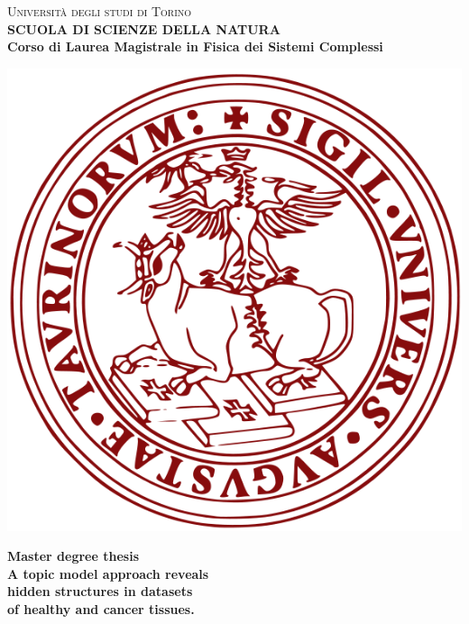 \begin{titlepage}
\begin{center}
{{\Large{\textsc{Universit\`a degli studi di Torino \\}}}} \vspace{5mm} {\small{\bf SCUOLA DI SCIENZE DELLA NATURA\\ \vspace{3mm}
Corso di Laurea Magistrale in Fisica dei Sistemi Complessi}}
\vspace{5mm}
\end{center}
\begin{center}
\includegraphics[scale=.3]{head/logo.png}
\end{center}
\begin{center}
\vspace{5mm}
{\large{\bf Master degree thesis\\}}
\vspace{5mm}
{\LARGE{\bf A topic model approach reveals \\hidden structures in datasets \\ of healthy and cancer tissues.\\}}
\end{center}
\vspace{21mm}

\end{titlepage}
